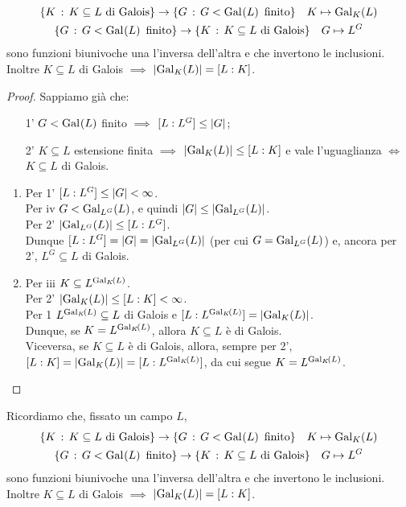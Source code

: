 \begin{coro}
\begin{gather*}
\{K\st K\subseteq L\text{ di Galois}\}\to\{G\st G<\Gal{L}\text{ finito}\}\quad K\mapsto\Gal[K]{L} \\
\{G\st G<\Gal{L}\text{ finito}\}\to\{K\st K\subseteq L\text{ di Galois}\}\quad G\mapsto L^G
\end{gather*}
sono funzioni biunivoche una l'inversa dell'altra e che invertono le inclusioni. Inoltre $K\subseteq L$ di Galois $\implies$ $\card{\Gal[K]{L}}=[L:K]$.
\end{coro}

\begin{proof}
Sappiamo gi\`a che:
\begin{enumerate}
\item[1'] $G<\Gal{L}$ finito $\implies$ $[L:L^G]\le\card{G}$;
\item[2'] $K\subseteq L$ estensione finita $\implies$ $\card{\Gal[K]{L}}\le[L:K]$ e vale l'uguaglianza $\iff$ $K\subseteq L$ di Galois.
\end{enumerate}
\begin{enumerate}
\item Per 1' $[L:L^G]\le\card{G}<\infty$. \\
Per iv $G<\Gal[L^G]{L}$, e quindi $\card{G}\le\card{\Gal[L^G]{L}}$. \\
Per 2' $\card{\Gal[L^G]{L}}\le[L:L^G]$. \\
Dunque $[L:L^G]=\card{G}=\card{\Gal[L^G]{L}}$ (per cui $G=\Gal[L^G]{L}$) e, ancora per 2', $L^G\subseteq L$ di Galois.
\item Per iii $K\subseteq L^{\Gal[K]{L}}$. \\
Per 2' $\card{\Gal[K]{L}}\le[L:K]<\infty$. \\
Per 1 $L^{\Gal[K]{L}}\subseteq L$ di Galois e $[L:L^{\Gal[K]{L}}]=\card{\Gal[K]{L}}$. \\
Dunque, se $K=L^{\Gal[K]{L}}$, allora $K\subseteq L$ è di Galois. \\
Viceversa, se $K\subseteq L$ è di Galois, allora, sempre per 2', $[L:K]=\card{\Gal[K]{L}}=[L:L^{\Gal[K]{L}}]$, da cui segue $K=L^{\Gal[K]{L}}$. \qedhere
\end{enumerate}
\end{proof}



Ricordiamo che, fissato un campo $L$,
\begin{gather*}
\{K\st K\subseteq L\text{ di Galois}\}\to\{G\st G<\Gal{L}\text{ finito}\}\quad K\mapsto\Gal[K]{L} \\
\{G\st G<\Gal{L}\text{ finito}\}\to\{K\st K\subseteq L\text{ di Galois}\}\quad G\mapsto L^G
\end{gather*}
sono funzioni biunivoche una l'inversa dell'altra e che invertono le inclusioni. Inoltre $K\subseteq L$ di Galois $\implies$ $\card{\Gal[K]{L}}=[L:K]$.

